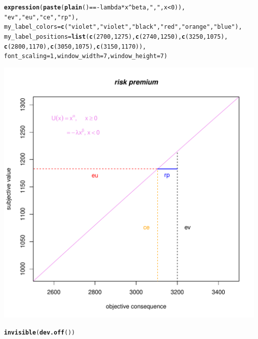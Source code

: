 \documentclass{article}\usepackage[]{graphicx}\usepackage[]{color}
\makeatletter
\newcommand{\hlnum}[1]{\textcolor[rgb]{0.686,0.059,0.569}{#1}}%
\newcommand{\hlstr}[1]{\textcolor[rgb]{0.192,0.494,0.8}{#1}}%
\newcommand{\hlopt}[1]{\textcolor[rgb]{0,0,0}{#1}}%
\newcommand{\hlstd}[1]{\textcolor[rgb]{0.345,0.345,0.345}{#1}}%
\newcommand{\hlkwc}[1]{\textcolor[rgb]{0.333,0.667,0.333}{#1}}%
\newcommand{\hlkwd}[1]{\textcolor[rgb]{0.737,0.353,0.396}{\textbf{#1}}}%
\newenvironment{kframe}{%
 \def\at@end@of@kframe{}%
 \ifinner\ifhmode%
  \def\at@end@of@kframe{\end{minipage}}%
  \begin{minipage}{\columnwidth}%
 \fi\fi%
 \def\FrameCommand##1{\hskip\@totalleftmargin \hskip-\fboxsep
 \colorbox{shadecolor}{##1}\hskip-\fboxsep
     \hskip-\linewidth \hskip-\@totalleftmargin \hskip\columnwidth}%
 \MakeFramed {\advance\hsize-\width
   \@totalleftmargin\z@ \linewidth\hsize
   \@setminipage}}%
 {\par\unskip\endMakeFramed%
 \at@end@of@kframe}
\newenvironment{knitrout}{}{} %
\makeatother
\begin{document}
\begin{knitrout}
\begin{kframe}
\begin{alltt}
                \hlkwd{expression}\hlstd{(}\hlkwd{paste}\hlstd{(}\hlkwd{plain}\hlstd{()}\hlopt{==-}\hlstd{lambda} \hlopt{*} \hlstd{x}\hlopt{^}\hlstd{beta,} \hlstr{", "}\hlstd{, x}\hlopt{<}\hlnum{0}\hlstd{)),}
                \hlstr{"ev"}\hlstd{,}\hlstr{"eu"}\hlstd{,}\hlstr{"ce"}\hlstd{,}\hlstr{"rp"}\hlstd{),}
        \hlkwc{my_label_colors}\hlstd{=}\hlkwd{c}\hlstd{(}\hlstr{"violet"}\hlstd{,}\hlstr{"violet"}\hlstd{,}\hlstr{"black"}\hlstd{,}\hlstr{"red"}\hlstd{,}\hlstr{"orange"}\hlstd{,}\hlstr{"blue"}\hlstd{),}
        \hlkwc{my_label_positions}\hlstd{=}\hlkwd{list}\hlstd{(}\hlkwd{c}\hlstd{(}\hlnum{2700}\hlstd{,}\hlnum{1275}\hlstd{),}\hlkwd{c}\hlstd{(}\hlnum{2740}\hlstd{,}\hlnum{1250}\hlstd{),}\hlkwd{c}\hlstd{(}\hlnum{3250}\hlstd{,}\hlnum{1075}\hlstd{),}
                \hlkwd{c}\hlstd{(}\hlnum{2800}\hlstd{,}\hlnum{1170}\hlstd{),}\hlkwd{c}\hlstd{(}\hlnum{3050}\hlstd{,}\hlnum{1075}\hlstd{),}\hlkwd{c}\hlstd{(}\hlnum{3150}\hlstd{,}\hlnum{1170}\hlstd{)),}
        \hlkwc{font_scaling}\hlstd{=}\hlnum{1}\hlstd{,} \hlkwc{window_width} \hlstd{=} \hlnum{7}\hlstd{,} \hlkwc{window_height} \hlstd{=} \hlnum{7}\hlstd{)}
\end{alltt}
\end{kframe}

{\centering \includegraphics[width=0.8\linewidth]{figure/unnamed-chunk-14} 

}


\begin{kframe}\begin{alltt}
\hlkwd{invisible}\hlstd{(}\hlkwd{dev.off}\hlstd{())}
\end{alltt}
\end{kframe}
\end{knitrout}
\end{document}
